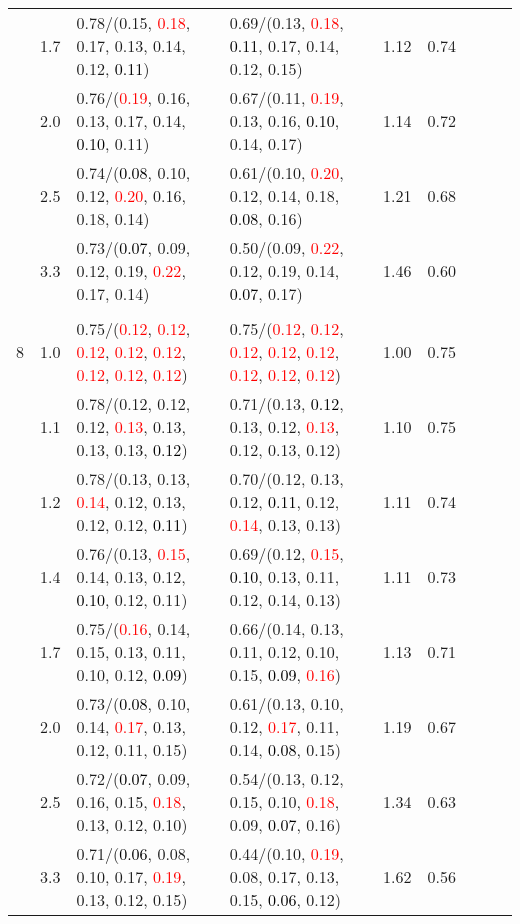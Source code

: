 \documentclass[10pt,a4paper]{report}
\begin{document}
\begin{table}[!htbp]
\begin{center}
{\begin{tabular}{ccllccccc}
			&1.7&0.78/(0.15, \textcolor{red}{0.18}, 0.17, 0.13, 0.14, 0.12, \textcolor{black}{0.11})&0.69/(0.13, \textcolor{red}{0.18}, \textcolor{black}{0.11}, 0.17, 0.14, 0.12, 0.15)&1.12&0.74\\
			&2.0&0.76/(\textcolor{red}{0.19}, 0.16, 0.13, 0.17, 0.14, \textcolor{black}{0.10}, 0.11)&0.67/(0.11, \textcolor{red}{0.19}, 0.13, 0.16, \textcolor{black}{0.10}, 0.14, 0.17)&1.14&0.72\\
			&2.5&0.74/(\textcolor{black}{0.08}, 0.10, 0.12, \textcolor{red}{0.20}, 0.16, 0.18, 0.14)&0.61/(0.10, \textcolor{red}{0.20}, 0.12, 0.14, 0.18, \textcolor{black}{0.08}, 0.16)&1.21&0.68\\
			&3.3&0.73/(\textcolor{black}{0.07}, 0.09, 0.12, 0.19, \textcolor{red}{0.22}, 0.17, 0.14)&0.50/(0.09, \textcolor{red}{0.22}, 0.12, 0.19, 0.14, \textcolor{black}{0.07}, 0.17)&1.46&0.60\\
			&&&&\\
			8			&1.0&0.75/(\textcolor{red}{0.12}, \textcolor{red}{0.12}, \textcolor{red}{0.12}, \textcolor{red}{0.12}, \textcolor{red}{0.12}, \textcolor{red}{0.12}, \textcolor{red}{0.12}, \textcolor{red}{0.12})&0.75/(\textcolor{red}{0.12}, \textcolor{red}{0.12}, \textcolor{red}{0.12}, \textcolor{red}{0.12}, \textcolor{red}{0.12}, \textcolor{red}{0.12}, \textcolor{red}{0.12}, \textcolor{red}{0.12})&1.00&0.75\\
			&1.1&0.78/(0.12, 0.12, 0.12, \textcolor{red}{0.13}, 0.13, 0.13, 0.13, \textcolor{black}{0.12})&0.71/(0.13, \textcolor{black}{0.12}, 0.13, 0.12, \textcolor{red}{0.13}, 0.12, 0.13, 0.12)&1.10&0.75\\
			&1.2&0.78/(0.13, 0.13, \textcolor{red}{0.14}, 0.12, 0.13, 0.12, 0.12, \textcolor{black}{0.11})&0.70/(0.12, 0.13, 0.12, \textcolor{black}{0.11}, 0.12, \textcolor{red}{0.14}, 0.13, 0.13)&1.11&0.74\\
			&1.4&0.76/(0.13, \textcolor{red}{0.15}, 0.14, 0.13, 0.12, \textcolor{black}{0.10}, 0.12, 0.11)&0.69/(0.12, \textcolor{red}{0.15}, \textcolor{black}{0.10}, 0.13, 0.11, 0.12, 0.14, 0.13)&1.11&0.73\\
			&1.7&0.75/(\textcolor{red}{0.16}, 0.14, 0.15, 0.13, 0.11, 0.10, 0.12, \textcolor{black}{0.09})&0.66/(0.14, 0.13, 0.11, 0.12, 0.10, 0.15, \textcolor{black}{0.09}, \textcolor{red}{0.16})&1.13&0.71\\
			&2.0&0.73/(\textcolor{black}{0.08}, 0.10, 0.14, \textcolor{red}{0.17}, 0.13, 0.12, 0.11, 0.15)&0.61/(0.13, 0.10, 0.12, \textcolor{red}{0.17}, 0.11, 0.14, \textcolor{black}{0.08}, 0.15)&1.19&0.67\\
			&2.5&0.72/(\textcolor{black}{0.07}, 0.09, 0.16, 0.15, \textcolor{red}{0.18}, 0.13, 0.12, 0.10)&0.54/(0.13, 0.12, 0.15, 0.10, \textcolor{red}{0.18}, 0.09, \textcolor{black}{0.07}, 0.16)&1.34&0.63\\
			&3.3&0.71/(\textcolor{black}{0.06}, 0.08, 0.10, 0.17, \textcolor{red}{0.19}, 0.13, 0.12, 0.15)&0.44/(0.10, \textcolor{red}{0.19}, 0.08, 0.17, 0.13, 0.15, \textcolor{black}{0.06}, 0.12)&1.62&0.56\\
			\bottomrule
		\end{tabular}}
	\end{center}
\end{table}
\end{document}

